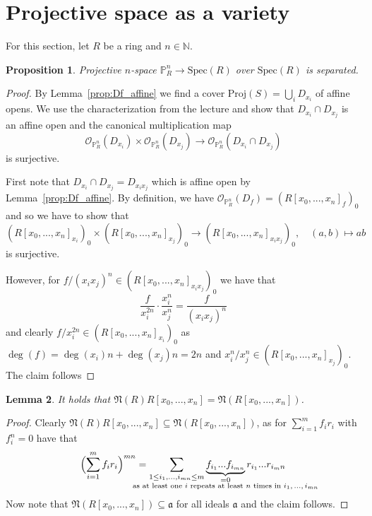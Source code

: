 \documentclass{scrartcl}
\newcommand{\N}{\mathbb{N}}
\renewcommand{\P}{\mathbb{P}}
\renewcommand{\a}{\mathfrak{a}}
\newcommand{\Nil}{\mathfrak{N}}
\newcommand{\Spec}{\mathrm{Spec}}
\newcommand{\Proj}{\mathrm{Proj}}
\renewcommand{\O}{\mathcal{O}}
\newtheorem{prop}{Proposition}
\newtheorem{lemma}[prop]{Lemma}
\theoremstyle{definition}
\begin{document}
\section{Projective space as a variety}
For this section, let $R$ be a ring and $n \in \N$.
\begin{prop}
    Projective $n$-space $\P_R^n \to \Spec(R)$ over $\Spec(R)$ is separated.
\end{prop}
\begin{proof}
    By Lemma~\ref{prop:Df_affine} we find a cover $\Proj(S) = \bigcup_i D_{x_i}$ of affine opens.
    We use the characterization from the lecture and show that $D_{x_i} \cap D_{x_j}$ is an affine open and the canonical multiplication map
    \begin{equation*}
        \O_{\P_R^n}(D_{x_i}) \times \O_{\P_R^n}(D_{x_j}) \to \O_{\P_R^n}(D_{x_i} \cap D_{x_j})
    \end{equation*}
    is surjective.
    
    First note that $D_{x_i} \cap D_{x_j} = D_{x_ix_j}$ which is affine open by Lemma~\ref{prop:Df_affine}.
    By definition, we have $\O_{\P_R^n}(D_f) = (R[x_0, ..., x_n]_f)_0$ and so we have to show that
    \begin{equation*}
        (R[x_0, ..., x_n]_{x_i})_0 \times (R[x_0, ..., x_n]_{x_j})_0 \to (R[x_0, ..., x_n]_{x_ix_j})_0, \quad (a, b) \mapsto ab
    \end{equation*}
    is surjective.
    
    However, for $f/(x_ix_j)^n \in (R[x_0, ..., x_n]_{x_ix_j})_0$ we have that
    \begin{equation*}
        \frac f {x_i^{2n}} \cdot \frac {x_i^n} {x_j^n} = \frac f {(x_ix_j)^n}
    \end{equation*}
    and clearly $f/x_i^{2n} \in (R[x_0, ..., x_n]_{x_i})_0$ as $\deg(f) = \deg(x_i) n + \deg(x_j) n = 2n$ and $x_i^n/x_j^n \in (R[x_0, ..., x_n]_{x_j})_0$.
    The claim follows
\end{proof}
\begin{lemma}
    \label{prop:nil_poly_ring}
    It holds that $\Nil(R)R[x_0, ..., x_n] = \Nil(R[x_0, ..., x_n])$.
\end{lemma}
\begin{proof}
    Clearly $\Nil(R)R[x_0, ..., x_n] \subseteq \Nil(R[x_0, ..., x_n])$, as for $\sum_{i = 1}^m f_i r_i$ with $f_i^n = 0$ have that
    \begin{equation*}
        \Bigl( \sum_{i = 1}^m f_i r_i \Bigr)^{m n} = \sum_{1 \leq i_1, ..., i_{mn} \leq m} \underbrace{f_{i_1} ... f_{i_{mn}}}_{\mathclap{\substack{= 0 \\ \text{as at least one $i$ repeats at least $n$ times in $i_1, ..., i_{mn}$}}}} r_{i_1} ... r_{i_mn}
    \end{equation*}
    Now note that $\Nil(R[x_0, ..., x_n]) \subseteq \a$ for all ideals $\a$ and the claim follows.
\end{proof}
\end{document}
